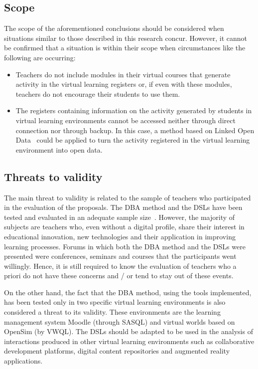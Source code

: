 \subsection{Scope}

The scope of the aforementioned conclusions should be considered when situations similar to those described in this research concur. However, it cannot be confirmed that a situation is within their scope when circumstances like the following are occurring:

\begin{itemize}
\item Teachers do not include modules in their virtual courses that generate activity in the virtual learning registers or, if even with these modules, teachers do not encourage their students to use them.
\item The registers containing information on the activity generated by students in virtual learning environments cannot be accessed neither through direct connection nor through backup. In this case, a method based on Linked Open Data~\cite{ruiz2015framework} could be applied to turn the activity registered in the virtual learning environment into open data. 
\end{itemize}

\subsection{Threats to validity}

The main threat to validity is related to the sample of teachers who participated in the evaluation of the proposals. The DBA method and the DSLs have been tested and evaluated in an adequate sample size~\cite{oates2006researching}. However, the majority of subjects are teachers who, even without a digital profile, share their interest in educational innovation, new technologies and their application in improving learning processes. Forums in which both the DBA method and the DSLs  were presented were conferences, seminars and courses that the participants went willingly. Hence, it is still required to know the evaluation of teachers who a priori do not have these concerns and / or tend to stay out of these events. 

On the other hand, the fact that the DBA method, using the tools implemented, has been tested only in two specific virtual learning environments is also considered a threat to its validity. These environments are the learning management system Moodle (through SASQL) and virtual worlds based on OpenSim (by VWQL). The DSLs should be adapted to be used in the analysis of interactions produced in other virtual learning environments such as collaborative development platforms, digital content repositories and augmented reality applications.

